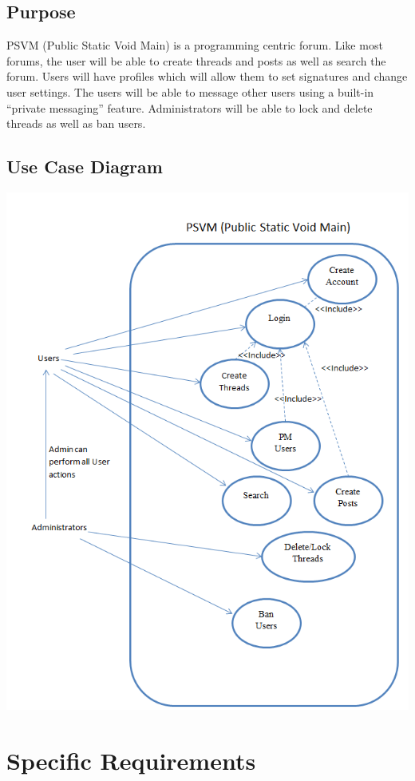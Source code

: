 \documentclass[12pt]{scrartcl}
\begin{document}
\subsection{Purpose}

PSVM (Public Static Void Main) is a programming centric forum. Like most forums, the user will be able to create threads and posts as well as search the forum. Users will have profiles which will allow them to set signatures and change user settings.  The users will be able to message other users using a built-in “private messaging” feature. Administrators will be able to lock and delete threads as well as ban users.

\subsection{Use Case Diagram}

\includegraphics{use-case.PNG}

\section{Specific Requirements}
\end{document}
